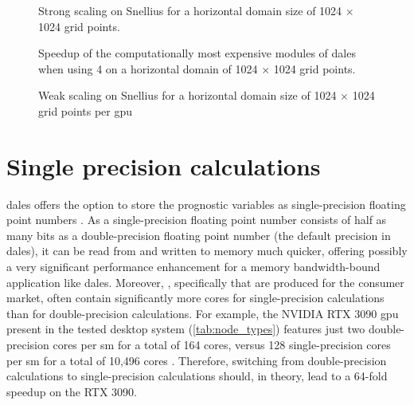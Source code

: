 \begin{figure}[h!]
    \centering
    
    \caption{Strong scaling on Snellius for a horizontal domain size of 1024 $\times$ 1024 grid points.}
    \label{fig:strong_scaling}
\end{figure}

\begin{figure}[h!]
    \centering
    
    \caption{Speedup of the computationally most expensive modules of \acrshort{dales} when using 4  on a horizontal domain of 1024 $\times$ 1024 grid points.}
    \label{fig:speedup_per_module}
\end{figure}

\begin{figure}[h!]
    \centering
    
    \caption{Weak scaling on Snellius for a horizontal domain size of 1024 $\times$ 1024 grid points per \acrshort{gpu}}
    \label{fig:weak_scaling}
\end{figure}

\newpage

\section{Single precision calculations}
\acrshort{dales} offers the option to store the prognostic variables as single-precision floating point numbers \citep{janssonCloudBotanyShallow2023}. As a single-precision floating point number consists of half as many bits as a double-precision floating point number (the default precision in \acrshort{dales}), it can be read from and written to memory much quicker, offering possibly a very significant performance enhancement for a memory bandwidth-bound application like \acrshort{dales}. Moreover, , specifically  that are produced for the consumer market, often contain significantly more cores for single-precision calculations than for double-precision calculations. For example, the NVIDIA RTX 3090 \acrshort{gpu} present in the tested desktop system (\autoref{tab:node_types}) features just two double-precision cores per \acrshort{sm} for a total of 164 cores, versus 128 single-precision cores per \acrshort{sm} for a total of 10,496 cores \citep{nvidiaNVIDIAAmpereGA1022021}. Therefore, switching from double-precision calculations to single-precision calculations should, in theory, lead to a 64-fold speedup on the RTX 3090. 

